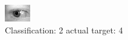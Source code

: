 \begin{figure}[h!]
\begin{center}
\includegraphics[width=0.60\columnwidth]{figures/ID768_class_2_target_4.png}
\end{center}
\caption{ Classification: 2 actual target: 4}
\label{fig:ID768_class_2_target_4}
\end{figure}
